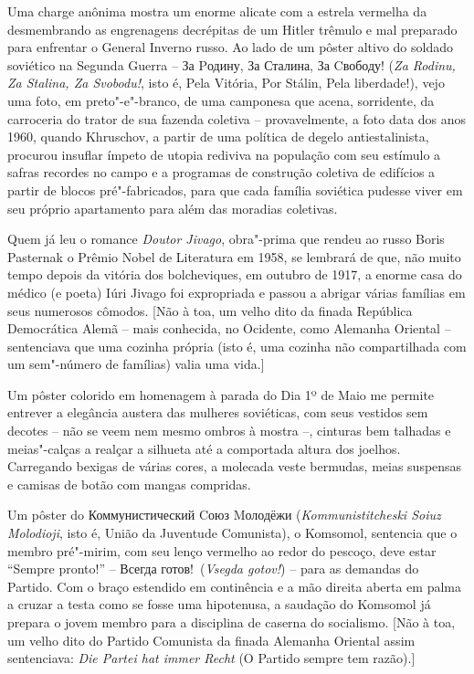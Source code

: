 Uma charge anônima mostra um enorme alicate com a estrela vermelha da
 desmembrando as engrenagens decrépitas de um Hitler trêmulo e mal
preparado para enfrentar o General Inverno russo. Ao lado de um pôster
altivo do soldado soviético na Segunda Guerra -- За
Pодину, За Сталина, За Cвободу! (\emph{Za Rodinu, Za Stalina, Za Svobodu!}, isto é, Pela
Vitória, Por Stálin, Pela liberdade!), vejo uma foto, em preto"-e"-branco,
de uma camponesa que acena, sorridente, da carroceria do trator de sua
fazenda coletiva -- provavelmente, a foto data dos anos 1960, quando
Khruschov, a partir de uma política de degelo antiestalinista, procurou
insuflar ímpeto de utopia rediviva na população com seu estímulo a
safras recordes no campo e a programas de construção coletiva de
edifícios a partir de blocos pré"-fabricados, para que cada família
soviética pudesse viver em seu próprio apartamento para além das
moradias coletivas.

Quem já leu o romance \emph{Doutor Jivago}, obra"-prima que rendeu ao
russo Boris Pasternak o Prêmio Nobel de Literatura em 1958, se lembrará
de que, não muito tempo depois da vitória dos bolcheviques, em outubro
de 1917, a enorme casa do médico (e poeta) Iúri Jivago foi expropriada e
passou a abrigar várias famílias em seus numerosos cômodos. {[}Não à
toa, um velho dito da finada República Democrática Alemã -- mais
conhecida, no Ocidente, como Alemanha Oriental -- sentenciava que uma
cozinha própria (isto é, uma cozinha não compartilhada com um sem"-número
de famílias) valia uma vida.{]}

Um pôster colorido em homenagem à parada do Dia 1º de Maio me permite
entrever a elegância austera das mulheres soviéticas, com seus vestidos
sem decotes -- não se veem nem mesmo ombros à mostra --, cinturas bem
talhadas e meias"-calças a realçar a silhueta até a comportada altura dos
joelhos. Carregando bexigas de várias cores, a molecada veste bermudas,
meias suspensas e camisas de botão com mangas compridas.

Um pôster do Коммунистический Cоюз Mолодёжи (\emph{Kommunistitcheski
Soiuz Molodioji}, isto é, União da Juventude Comunista), o Komsomol,
sentencia que o membro pré"-mirim, com seu lenço vermelho ao redor do
pescoço, deve estar ``Sempre pronto!'' -- Всегда готов!~(\emph{Vsegda
gotov!}) -- para as demandas do Partido. Com o braço estendido em
continência e a mão direita aberta em palma a cruzar a testa como se
fosse uma hipotenusa, a saudação do Komsomol já prepara o jovem membro
para a disciplina de caserna do socialismo. {[}Não à toa, um velho dito
do Partido Comunista da finada Alemanha Oriental assim sentenciava:
\emph{Die Partei hat immer Recht} (O Partido sempre tem razão).{]}

